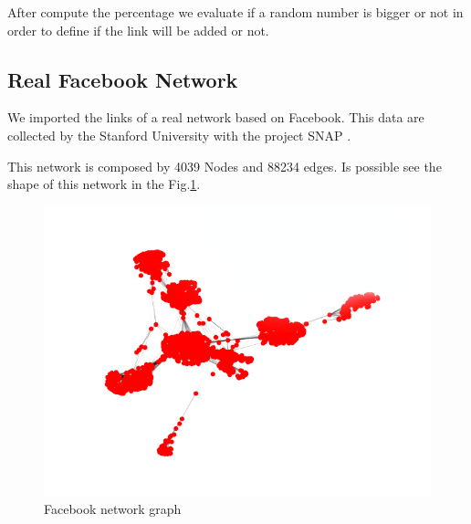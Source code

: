         After compute the percentage we evaluate if a random number is bigger or not in order to define if the link will be added or not.
        
    \subsection{Real Facebook Network}
        We imported the links of a real network based on Facebook. This data are collected by the Stanford University with the project SNAP \cite{stanford_Facebook}.
        
        This network is composed by 4039 Nodes and 88234 edges. Is possible see the shape of this network in the Fig.\ref{fig:Facebook}.
        \begin{figure}[t]
            \centering
            \includegraphics[width=\linewidth]{Figure/FacebookGraph.png}
            \caption{Facebook network graph}
            \label{fig:Facebook}
        \end{figure}